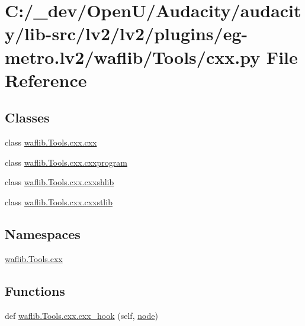 \hypertarget{lv2_2plugins_2eg-metro_8lv2_2waflib_2_tools_2cxx_8py}{}\section{C\+:/\+\_\+dev/\+Open\+U/\+Audacity/audacity/lib-\/src/lv2/lv2/plugins/eg-\/metro.lv2/waflib/\+Tools/cxx.py File Reference}
\label{lv2_2plugins_2eg-metro_8lv2_2waflib_2_tools_2cxx_8py}
\subsection*{Classes}
\begin{DoxyCompactItemize}
\item 
class \hyperlink{classwaflib_1_1_tools_1_1cxx_1_1cxx}{waflib.\+Tools.\+cxx.\+cxx}
\item 
class \hyperlink{classwaflib_1_1_tools_1_1cxx_1_1cxxprogram}{waflib.\+Tools.\+cxx.\+cxxprogram}
\item 
class \hyperlink{classwaflib_1_1_tools_1_1cxx_1_1cxxshlib}{waflib.\+Tools.\+cxx.\+cxxshlib}
\item 
class \hyperlink{classwaflib_1_1_tools_1_1cxx_1_1cxxstlib}{waflib.\+Tools.\+cxx.\+cxxstlib}
\end{DoxyCompactItemize}
\subsection*{Namespaces}
\begin{DoxyCompactItemize}
\item 
 \hyperlink{namespacewaflib_1_1_tools_1_1cxx}{waflib.\+Tools.\+cxx}
\end{DoxyCompactItemize}
\subsection*{Functions}
\begin{DoxyCompactItemize}
\item 
def \hyperlink{namespacewaflib_1_1_tools_1_1cxx_a31f0414cdfdb6dd749e0f65f788bfbda}{waflib.\+Tools.\+cxx.\+cxx\+\_\+hook} (self, \hyperlink{structnode}{node})
\end{DoxyCompactItemize}
